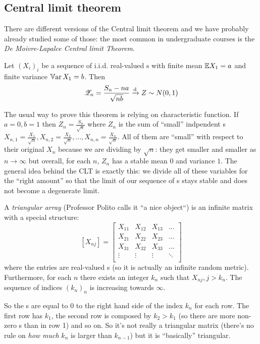 \documentclass{report}
\begin{document}
\subsection{Central limit theorem}
There are different versions of the Central limit theorem and we have probably already studied some of those: the most common in undergraduate courses is the \emph{De Moivre-Lapalce Central limit Theorem}.
\begin{theorem}
	Let ${(X_i)}_{i}$ be a sequence of i.i.d. real-valued \rv s with finite mean $\mathbb{E} X_1=a$ and finite variance $\mathbb{V}\mathrm{ar}\, X_1=b$. Then
	\[\mathscr{Z}_{n}=\frac{S_n-na}{\sqrt{nb}}\xrightarrow[]{\text{d}} Z\sim N(0,1)\]
\end{theorem}
The usual way to prove this theorem is relying on characteristic function. If $a=0,b=1$ then $Z_{n}=\frac{S_n}{\sqrt{n}}$ where $Z_{n}$ is the sum of ``small'' indpendent \rv s $X_{n,1}=\frac{X_1}{\sqrt{n}},X_{n,2}=\frac{X_2}{\sqrt{n}},\ldots,X_{n,n}=\frac{X_n}{\sqrt{n}}$. All of them are ``small'' with respect to their original \rv{} $X_n$ because we are dividing by $\sqrt{n}$: they get smaller and smaller as $n\to\infty$ but overall, for each $n$, $Z_{n}$ has a stable mean $0$ and variance $1$. The general idea behind the CLT is exactly this: we divide all of these variables for the ``right amount'' so that the limit of our sequence of \rv s stays stable and does not become a degenerate limit.
\begin{definition}
	A \emph{triangular array} (Professor Polito calls it ``a nice object``) is an infinite matrix with a special structure:
	\[\left[X_{nj}\right]=\begin{bmatrix}
		X_{11}&X_{12}&X_{13}&\ldots\\
		X_{21}&X_{22}&X_{23}&\ldots\\
		X_{31}&X_{32}&X_{33}&\ldots\\
		\vdots&\vdots&\vdots&\ddots\\
	\end{bmatrix}\]
	where the entries are real-valued \rv s (so it is actually an infinite random metric). Furthermore, for each $n$ there exists an integer $k_{n}$ such that $X_{nj},j>k_{n}$. The sequence of indices ${(k_{n})}_{n}$ is increasing towards $\infty$.
\end{definition}
So the \rv s are equal to 0 to the right hand side of the index $k_n$ for each row. The first row has $k_1$, the second row is composed by $k_2>k_1$ (so there are more non-zero \rv s than in row 1) and so on. So it's not really a triangular matrix (there's no rule on \textit{how much} $k_{n}$ is larger than $k_{n-1}$) but it is ``basically'' triangular. \\
\end{document}
